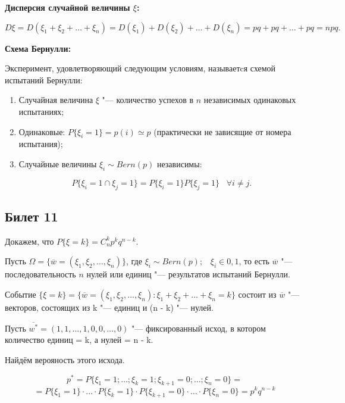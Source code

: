 \textbf{Дисперсия случайной величины $\xi$:}
\smallskip

\[
    D\xi = D(\xi_1 + \xi_2 + \dots + \xi_n) =
    D(\xi_1) + D(\xi_2) + \dots + D(\xi_n) =
    pq + pq + \dots + pq = npq.
\]
\bigskip

\textbf{Схема Бернулли:}
\smallskip

Эксперимент, удовлетворяющий следующим условиям,
называетcя схемой испытаний Бернулли:

\begin{enumerate}
    \item{Случайная величина $\xi$ "--- количество успехов
    в $n$ независимых одинаковых испытаниях;}
    \item{                     
    Одинаковые: $P\{\xi_i = 1\} = p(i) \simeq p$
    (практически не зависящие от номера испытания);}
    \item{Случайные величины $\xi_i \sim Bern(p)$
    независимы:
    
    \[
        P\{\xi_i = 1\cap \xi_j = 1\} =
        P\{\xi_i = 1\} P\{\xi_j = 1\} \;\;\; 
        \forall i \neq j.  
    \]
    }
\end{enumerate}

\subsection{Билет 11}

Докажем, что $P\{\xi = k\} = C^k_n p ^k q^{n - k}$.
\bigskip

Пусть $\Omega = \{\overline{w} = (\xi_1, \xi_2, \dots, 
\xi_n)\}$, где $\xi_i \sim Bern(p); \;\;\; \xi_i \in
{0, 1}$, то есть $\overline{w}$ "--- последовательность 
$n$ нулей или единиц "--- результатов испытаний Бернулли.
\bigskip

Событие $\{\xi = k\} = \{\overline{w} = (\xi_1, \xi_2, \dots, 
\xi_n) : \xi_1 + \xi_2 + \dots + \xi_n = k\}$ состоит
из $\overline{w}$ "--- векторов, состоящих из k "--- единиц и (n - k) "---
нулей.
\bigskip

Пусть $\overline{w^{*}} = (1, 1, \dots, 1, 0, 0, \dots, 0)$ "---
фиксированный исход, в котором количество единиц = k, а нулей = n - k.
\smallskip

Найдём верояность этого исхода.
\smallskip

\[
p^{*} = P\{\xi_1 = 1; \dots ; \xi_k = 1; \xi_{k + 1} =
0; \dots ; \xi_n = 0\} = 
\]
\[
= P\{\xi_1 = 1\}\cdot\dots\cdot
P\{\xi_k = 1\}\cdot P\{\xi_{k + 1} = 0\}\cdot\dots\cdot
P\{\xi_n = 0\} = p^k q^{n - k}
\]
\smallskip

